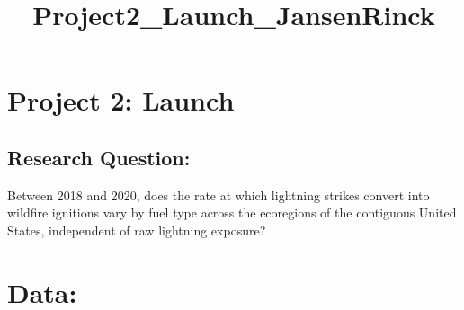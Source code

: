 \documentclass[11pt]{article}
\title{Project2\_Launch\_JansenRinck}
\begin{document}
    
    \maketitle
    
    

    
    \hypertarget{project-2-launch}{%
\section{Project 2: Launch}\label{project-2-launch}}

    \hypertarget{research-question}{%
\subsection{Research Question:}\label{research-question}}

Between 2018 and 2020, does the rate at which lightning strikes convert
into wildfire ignitions vary by fuel type across the ecoregions of the
contiguous United States, independent of raw lightning exposure?

    \hypertarget{data}{%
\section{Data:}\label{data}}
\end{document}
